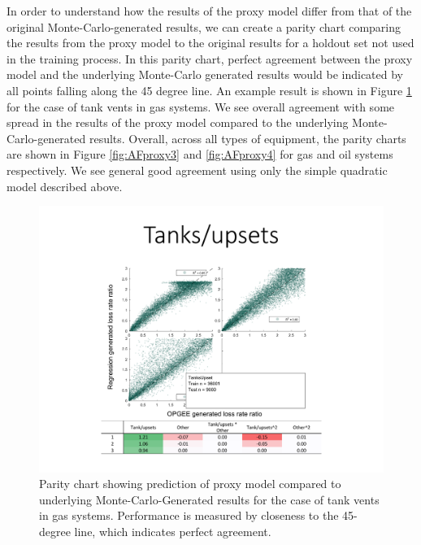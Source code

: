 \documentclass[11pt]{report}
\begin{document}
In order to understand how the results of the proxy model differ from that of the original Monte-Carlo-generated results, we can create a parity chart comparing the results from the proxy model to the original results for a holdout set not used in the training process. In this parity chart, perfect agreement between the proxy model and the underlying Monte-Carlo generated results would be indicated by all points falling along the 45 degree line. An example result is shown in Figure \ref{fig:AFproxy6} for the case of tank vents in gas systems. We see overall agreement with some spread in the results of the proxy model compared to the underlying Monte-Carlo-generated results. Overall, across all types of equipment, the parity charts are shown in Figure \ref{fig:AFproxy3} and \ref{fig:AFproxy4} for gas and oil systems respectively. We see general good agreement using only the simple quadratic model described above.

 \begin{figure}[t]
\includegraphics[width=1\columnwidth]{images/ProxyAF_Model_Pic6.pdf}
\caption{Parity chart showing prediction of proxy model compared to underlying Monte-Carlo-Generated results for the case of tank vents in gas systems. Performance is measured by closeness to the 45-degree line, which indicates perfect agreement.}
\label{fig:AFproxy6}
\end{figure}  
\end{document}
